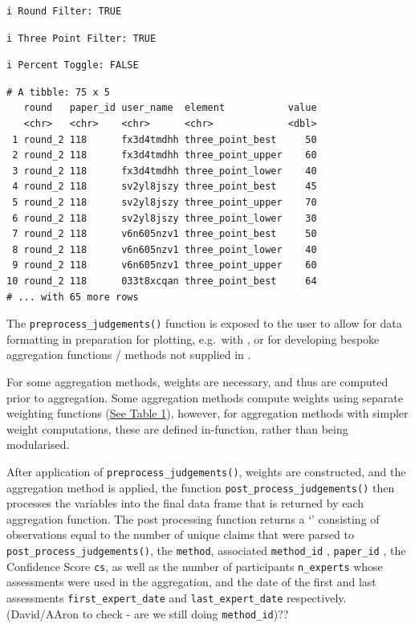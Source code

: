 \documentclass[article]{jss}
\newcommand{\class}[1]{`\code{#1}'}
\begin{document}
\begin{tcolorbox}[enhanced jigsaw, breakable, opacityback=0, left=2mm, toprule=.15mm, rightrule=.15mm, bottomrule=.15mm, colframe=quarto-callout-color-frame, arc=.35mm, leftrule=.75mm, colback=white]
\begin{verbatim}
\end{verbatim}

\begin{verbatim}
i Round Filter: TRUE
\end{verbatim}

\begin{verbatim}
i Three Point Filter: TRUE
\end{verbatim}

\begin{verbatim}
i Percent Toggle: FALSE
\end{verbatim}

\begin{verbatim}
# A tibble: 75 x 5
   round   paper_id user_name  element           value
   <chr>   <chr>    <chr>      <chr>             <dbl>
 1 round_2 118      fx3d4tmdhh three_point_best     50
 2 round_2 118      fx3d4tmdhh three_point_upper    60
 3 round_2 118      fx3d4tmdhh three_point_lower    40
 4 round_2 118      sv2yl8jszy three_point_best     45
 5 round_2 118      sv2yl8jszy three_point_upper    70
 6 round_2 118      sv2yl8jszy three_point_lower    30
 7 round_2 118      v6n605nzv1 three_point_best     50
 8 round_2 118      v6n605nzv1 three_point_lower    40
 9 round_2 118      v6n605nzv1 three_point_upper    60
10 round_2 118      033t8xcqan three_point_best     64
# ... with 65 more rows
\end{verbatim}

The \texttt{preprocess\_judgements()} function is exposed to the user to
allow for data formatting in preparation for plotting, e.g.~with
 \citep{ggplot2016}, or for developing bespoke aggregation
functions / methods not supplied in .

For some aggregation methods, weights are necessary, and thus are
computed prior to aggregation. Some aggregation methods compute weights
using separate weighting functions (\protect\hyperlink{table1}{See Table
1}), however, for aggregation methods with simpler weight computations,
these are defined in-function, rather than being modularised.

After application of \texttt{preprocess\_judgements()}, weights are
constructed, and the aggregation method is applied, the function
\texttt{post\_process\_judgements()} then processes the variables into
the final data frame that is returned by each aggregation function. The
post processing function returns a \class{tibble} consisting of
observations equal to the number of unique claims that were parsed to
\texttt{post\_process\_judgements()}, the \texttt{method}, associated
\texttt{method\_id} , \texttt{paper\_id} , the Confidence Score
\texttt{cs}, as well as the number of participants \texttt{n\_experts}
whose assessments were used in the aggregation, and the date of the
first and last assessments \texttt{first\_expert\_date} and
\texttt{last\_expert\_date} respectively. (David/AAron to check - are we
still doing \texttt{method\_id})??
\end{tcolorbox}
\end{document}
